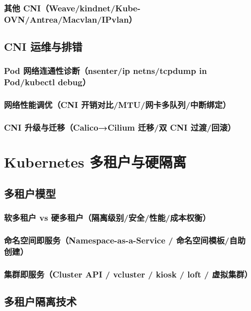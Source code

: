 \documentclass[12pt,UTF8]{ctexbook}
\begin{document}
    \subsection{其他 CNI（Weave/kindnet/Kube-OVN/Antrea/Macvlan/IPvlan）}

  \section{CNI 运维与排错}
    \subsection{Pod 网络连通性诊断（nsenter/ip netns/tcpdump in Pod/kubectl debug）}
    \subsection{网络性能调优（CNI 开销对比/MTU/网卡多队列/中断绑定）}
    \subsection{CNI 升级与迁移（Calico→Cilium 迁移/双 CNI 过渡/回滚）}


\chapter{Kubernetes 多租户与硬隔离}
\label{chap:k8s-multi-tenancy}

  \section{多租户模型}
    \subsection{软多租户 vs 硬多租户（隔离级别/安全/性能/成本权衡）}
    \subsection{命名空间即服务（Namespace-as-a-Service / 命名空间模板/自助创建）}
    \subsection{集群即服务（Cluster API / vcluster / kiosk / loft / 虚拟集群）}

  \section{多租户隔离技术}
\end{document}
